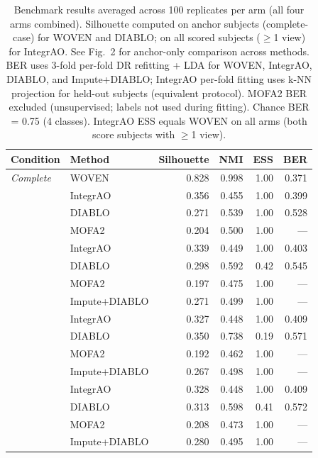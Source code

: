 \begin{table}[ht]
\centering
\small
\caption{Benchmark results averaged across 100 replicates per arm (all four arms combined). Silhouette computed on anchor subjects (complete-case) for WOVEN and DIABLO; on all scored subjects ($\geq$1 view) for IntegrAO. See Fig.~2 for anchor-only comparison across methods. BER uses 3-fold per-fold DR refitting + LDA for WOVEN, IntegrAO, DIABLO, and Impute+DIABLO; IntegrAO per-fold fitting uses k-NN projection for held-out subjects (equivalent protocol). MOFA2 BER excluded (unsupervised; labels not used during fitting). Chance BER = 0.75 (4 classes). IntegrAO ESS equals WOVEN on all arms (both score subjects with $\geq$1 view).}
\label{tab:main_benchmark}
\begin{tabular}{llrrrr}
\toprule
Condition & Method & Silhouette & NMI & ESS & BER \\
\midrule
\textit{Complete} & WOVEN & 0.828 & 0.998 & 1.00 & 0.371 \\
& IntegrAO & 0.356 & 0.455 & 1.00 & 0.399 \\
& DIABLO & 0.271 & 0.539 & 1.00 & 0.528 \\
& MOFA2 & 0.204 & 0.500 & 1.00 & --- \\
\midrule
\textit{MCAR 30%
& IntegrAO & 0.339 & 0.449 & 1.00 & 0.403 \\
& DIABLO & 0.298 & 0.592 & 0.42 & 0.545 \\
& MOFA2 & 0.197 & 0.475 & 1.00 & --- \\
& Impute+DIABLO & 0.271 & 0.499 & 1.00 & --- \\
\midrule
\textit{MCAR 50%
& IntegrAO & 0.327 & 0.448 & 1.00 & 0.409 \\
& DIABLO & 0.350 & 0.738 & 0.19 & 0.571 \\
& MOFA2 & 0.192 & 0.462 & 1.00 & --- \\
& Impute+DIABLO & 0.267 & 0.498 & 1.00 & --- \\
\midrule
\textit{MAR 30%
& IntegrAO & 0.328 & 0.448 & 1.00 & 0.409 \\
& DIABLO & 0.313 & 0.598 & 0.41 & 0.572 \\
& MOFA2 & 0.208 & 0.473 & 1.00 & --- \\
& Impute+DIABLO & 0.280 & 0.495 & 1.00 & --- \\
\bottomrule
\end{tabular}
\end{table}
